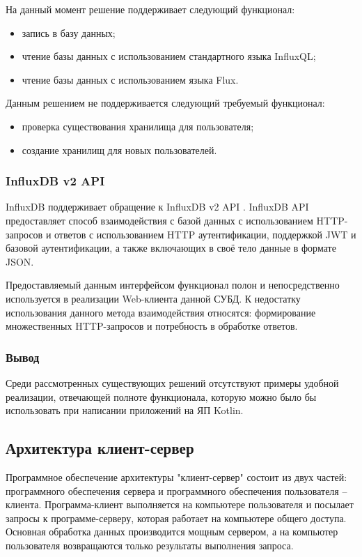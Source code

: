 На данный момент решение поддерживает следующий функционал:
\begin{itemize}[leftmargin=1.6\parindent]
\item запись в базу данных;
\item чтение базы данных с использованием стандартного языка InfluxQL;
\item чтение базы данных с использованием языка Flux.
\end{itemize}

Данным решением не поддерживается следующий требуемый функционал:
\begin{itemize}[leftmargin=1.6\parindent]
\item проверка существования хранилища для пользователя;
\item создание хранилищ для новых пользователей.
\end{itemize}

\subsubsection{InfluxDB v2 API}
InfluxDB поддерживает обращение к InfluxDB v2 API \cite{influxApi}. InfluxDB API предоставляет способ взаимодействия с базой данных с использованием HTTP-запросов и ответов с использованием HTTP аутентификации, поддержкой JWT и базовой аутентификации, а также включающих в своё тело данные в формате JSON.

Предоставляемый данным интерфейсом функционал полон и непосредственно используется в реализации Web-клиента данной СУБД. К недостатку использования данного метода взаимодействия относятся: формирование множественных HTTP-запросов и потребность в обработке ответов.

\subsubsection*{Вывод}
Среди рассмотренных существующих решений отсутствуют примеры удобной реализации, отвечающей полноте функционала, которую можно было бы использовать при написании приложений на ЯП Kotlin.

\subsection{Архитектура клиент-сервер}
Программное обеспечение архитектуры "клиент-сервер" состоит из двух частей: программного обеспечения сервера и программного обеспечения пользователя -- клиента. Программа-клиент выполняется на компьютере пользователя и посылает запросы к программе-серверу, которая работает на компьютере общего доступа. Основная обработка данных производится мощным сервером, а на компьютер пользователя возвращаются только результаты выполнения запроса. \cite{clientServer}

